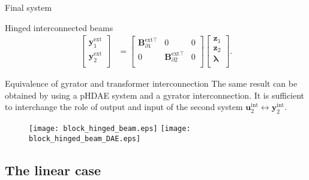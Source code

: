 \documentclass[aspectratio=169]{ISAE-Beamer}
\begin{document}
\begin{frame}{Final system}
\begin{block}{Hinged interconnected beams}
\begin{equation*}
\begin{aligned}
\begin{bmatrix}
\mathbf{y}_1^{\text{ext}} \\ \mathbf{y}_2^{\text{ext}} \\
\end{bmatrix}  &= \begin{bmatrix}
\mathbf{B}_{\partial 1}^{\text{ext} \top} & 0 & 0 \\
0 & \mathbf{B}_{\partial 2}^{\text{ext} \top} & 0 \\
\end{bmatrix} \begin{bmatrix}
\mathbf{z}_1  \\ 
\mathbf{z}_2  \\ 
\bm{\lambda} \\
\end{bmatrix}.
\end{aligned}
\end{equation*}
\end{block}
\end{frame}

\begin{frame}{Equivalence of gyrator and transformer interconnection}
The same result can be obtained by using a pHDAE system and a gyrator interconnection.  It is sufficient to interchange the role of output and input of the second system $\mathbf{u}_2^{\text{int}} \leftrightarrow \mathbf{y}_2^{\text{int}}$. 
\begin{figure}[t]
	\centering
	\texttt{[image: block\_hinged\_beam.eps]} \hspace{.5cm}
	\texttt{[image: block\_hinged\_beam\_DAE.eps]} 	
\end{figure}

\end{frame}

\subsection{The linear case}
\end{document}

